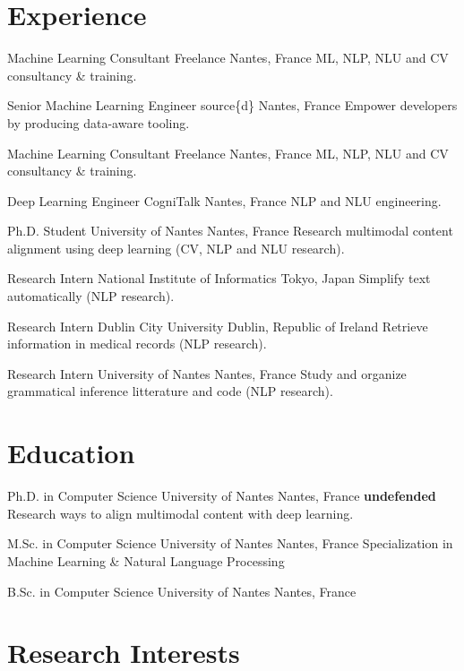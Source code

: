 \documentclass[11pt,a4paper]{moderncv}
\begin{document}
\makecvtitle

\section{Experience}

%
{Machine Learning Consultant}%
{Freelance}%
{Nantes, France}%
{}%
{ML, NLP, NLU and CV consultancy \& training.}

%
{Senior Machine Learning Engineer}%
{source\{d\}}%
{Nantes, France}%
{}%
{Empower developers by producing data-aware tooling.}

%
{Machine Learning Consultant}%
{Freelance}%
{Nantes, France}%
{}%
{ML, NLP, NLU and CV consultancy \& training.}

%
{Deep Learning Engineer}%
{CogniTalk}%
{Nantes, France}%
{}%
{NLP and NLU engineering.}

%
{Ph.D. Student}%
{University of Nantes}%
{Nantes, France}%
{}%
{Research multimodal content alignment using deep learning (CV, NLP
  and NLU research).}

%
{Research Intern}%
{National Institute of Informatics}%
{Tokyo, Japan}%
{}%
{Simplify text automatically (NLP research).}

%
{Research Intern}%
{Dublin City University}%
{Dublin, Republic of Ireland}%
{}%
{Retrieve information in medical records (NLP research).}

%
{Research Intern}%
{University of Nantes}%
{Nantes, France}%
{}%
{Study and organize grammatical inference litterature and code
  (NLP research).}

\section{Education}

%
{Ph.D. in Computer Science}%
{University of Nantes}%
{Nantes, France}%
{\textbf{undefended}}%
{Research ways to align multimodal content with deep learning.}

%
{M.Sc. in Computer Science}%
{University of Nantes}%
{Nantes, France}%
{}%
{Specialization in Machine Learning \& Natural Language Processing}

%
{B.Sc. in Computer Science}%
{University of Nantes}%
{Nantes, France}%
{}%
{}

\section{Research Interests}
\end{document}
